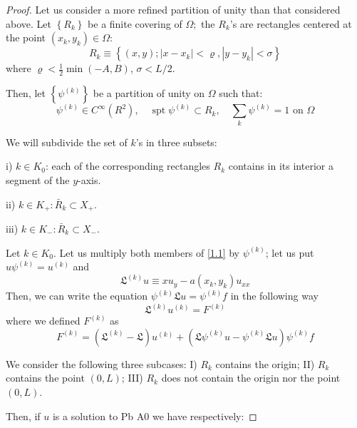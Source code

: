 \documentclass[a4paper,12pt,leqno]{article}
\numberwithin{equation}{section}
\begin{document}
\begin{proof}
	Let us consider a more refined partition of unity than that considered above. Let $\left\{R_{k}\right\}$ be a finite covering of $\Omega;$ the $R_{k}$'s are rectangles centered at the point $\left(x_{k}, y_{k}\right) \in \Omega$:
	\begin{equation*}
		R_{k} \equiv\left\{(x, y);\left|x-x_{k}\right|<\varrho,\left|y-y_{k}\right|<\sigma\right\}
	\end{equation*}
	where $\varrho<\frac{1}{2} \min (-A, B)$, $\sigma<L / 2$.

Then, let $\left\{\psi^{(k)}\right\}$ be a partition of unity on $\Omega$ such that:
\begin{equation*}
	\psi^{(k)} \in C^{\infty}\left(R^{2}\right), \quad \operatorname{spt} \psi^{(k)} \subset R_{k}, \quad \sum_{k} \psi^{(k)}=1 \text { on } \Omega
\end{equation*}

We will subdivide the set of $k$'s in three subsets:

i) $k \in K_{0}$: each of the corresponding rectangles $R_{k}$ contains in its interior a segment of the $y$-axis.

ii) $k \in K_{+}: \bar{R}_{k} \subset X_{+}$.

iii) $k \in K_{-}: \bar{R}_{k} \subset X_{-}$.

\noindent
Let $k \in K_{0}$. Let us multiply both members of \cref{1.1} by $\psi^{(k)}$; let us put $u \psi^{(k)}=u^{(k)}$ and
\begin{equation} \label{3.2}
	\mathfrak{L}^{(k)} u \equiv x u_{y}-a\left(x_{k}, y_{k}\right) u_{xx}
\end{equation}
Then, we can write the equation $\psi^{(k)} \mathfrak{L}u =\psi^{(k)} f$ in the following way
\begin{equation} \label{3.3}
	\mathfrak{L}^{(k)} u^{(k)}=F^{(k)}
\end{equation} 
where we defined $F^{(k)}$ as
\begin{equation} \label{3.4}
	F^{(k)} = (\mathfrak{L}^{(k)} - \mathfrak{L}) u^{(k)}
	+ (\mathfrak{L} \psi^{(k)} u - \psi^{(k)} \mathfrak{L} u)
	\psi^{(k)} f
\end{equation}

\newpage


We consider the following three subcases: I) $R_{k}$ contains the origin; II) $R_{k}$ contains the point $(0, L)$; III) $R_{k}$ does not contain the origin nor the point $(0, L)$.

Then, if $u$ is a solution to Pb A0 we have respectively:


\end{proof}
\end{document}

